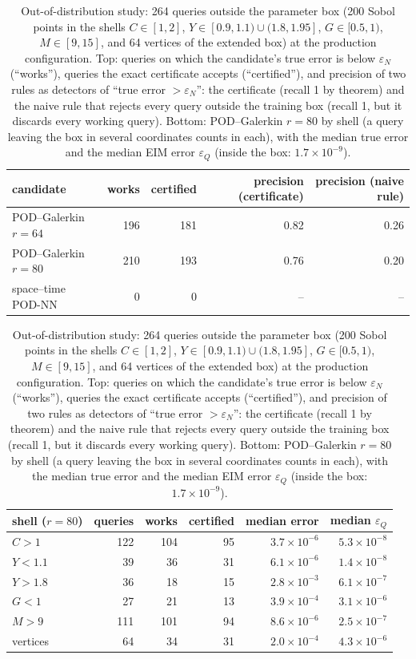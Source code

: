 \begin{table}[!htbp]
\centering\small
\caption{Out-of-distribution study: 264 queries outside the parameter box (200 Sobol points in the
shells $C\in[1,2]$, $Y\in[0.9,1.1)\cup(1.8,1.95]$, $G\in[0.5,1)$, $M\in[9,15]$, and 64 vertices of the
extended box) at the production configuration.  Top: queries on which the candidate's true error
is below $\varepsilon_N$ (``works''), queries the exact certificate accepts (``certified''), and
precision of two rules as detectors of ``true error $>\varepsilon_N$'': the certificate (recall 1 by
theorem) and the naive rule that rejects every query outside the training box (recall 1, but it
discards every working query).  Bottom: POD--Galerkin $r=80$ by shell (a query leaving the box in
several coordinates counts in each), with the median true error and the median EIM error
$\varepsilon_Q$ (inside the box: $1.7\times10^{-9}$).}
\label{tab:ood}
\begin{tabular}{lrrrr}
\toprule
candidate & works & certified & precision (certificate) & precision (naive rule)\\
\midrule
POD--Galerkin $r=64$ & 196 & 181 & 0.82 & 0.26\\
POD--Galerkin $r=80$ & 210 & 193 & 0.76 & 0.20\\
space--time POD-NN & 0 & 0 & -- & --\\
\bottomrule
\end{tabular}
\par\smallskip
\begin{tabular}{lrrrrr}
\toprule
shell ($r=80$) & queries & works & certified & median error & median $\varepsilon_Q$\\
\midrule
$C>1$ & 122 & 104 & 95 & $3.7\times10^{-6}$ & $5.3\times10^{-8}$\\
$Y<1.1$ & 39 & 36 & 31 & $6.1\times10^{-6}$ & $1.4\times10^{-8}$\\
$Y>1.8$ & 36 & 18 & 15 & $2.8\times10^{-3}$ & $6.1\times10^{-7}$\\
$G<1$ & 27 & 21 & 13 & $3.9\times10^{-4}$ & $3.1\times10^{-6}$\\
$M>9$ & 111 & 101 & 94 & $8.6\times10^{-6}$ & $2.5\times10^{-7}$\\
vertices & 64 & 34 & 31 & $2.0\times10^{-4}$ & $4.3\times10^{-6}$\\
\bottomrule
\end{tabular}
\end{table}
